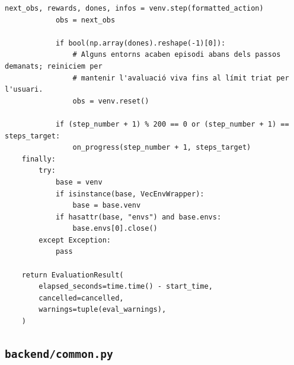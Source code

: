 \documentclass[10pt,a4paper]{article}
\begin{document}
\begin{lstlisting}[style=studioPython,caption={backend/avaluar\_agent\_backend.py},label={lst:backend-avaluar-agent-backend-py}]
            next_obs, rewards, dones, infos = venv.step(formatted_action)
            obs = next_obs

            if bool(np.array(dones).reshape(-1)[0]):
                # Alguns entorns acaben episodi abans dels passos demanats; reiniciem per
                # mantenir l'avaluació viva fins al límit triat per l'usuari.
                obs = venv.reset()

            if (step_number + 1) % 200 == 0 or (step_number + 1) == steps_target:
                on_progress(step_number + 1, steps_target)
    finally:
        try:
            base = venv
            if isinstance(base, VecEnvWrapper):
                base = base.venv
            if hasattr(base, "envs") and base.envs:
                base.envs[0].close()
        except Exception:
            pass

    return EvaluationResult(
        elapsed_seconds=time.time() - start_time,
        cancelled=cancelled,
        warnings=tuple(eval_warnings),
    )
\end{lstlisting}


\subsection{\texorpdfstring{\texttt{backend/common.py}}{backend/common.py}}
\end{document}
